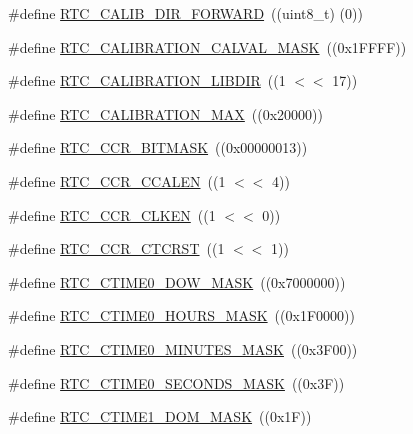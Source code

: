 \begin{DoxyCompactItemize}
\item 
\#define \hyperlink{group__RTC__17XX__40XX_ga4f53042ce8b730a4b2c6eb40b856e4e8}{R\+T\+C\+\_\+\+C\+A\+L\+I\+B\+\_\+\+D\+I\+R\+\_\+\+F\+O\+R\+W\+A\+RD}~((uint8\+\_\+t) (0))
\item 
\#define \hyperlink{group__RTC__17XX__40XX_gafe263620e5d0709ddf51abfdf408c770}{R\+T\+C\+\_\+\+C\+A\+L\+I\+B\+R\+A\+T\+I\+O\+N\+\_\+\+C\+A\+L\+V\+A\+L\+\_\+\+M\+A\+SK}~((0x1\+F\+F\+F\+F))
\item 
\#define \hyperlink{group__RTC__17XX__40XX_gae818a2f408ec0a1025ab3f02947d4b84}{R\+T\+C\+\_\+\+C\+A\+L\+I\+B\+R\+A\+T\+I\+O\+N\+\_\+\+L\+I\+B\+D\+IR}~((1 $<$$<$ 17))
\item 
\#define \hyperlink{group__RTC__17XX__40XX_gaeb077cfbe5f74f3b15ff72fed96abfe6}{R\+T\+C\+\_\+\+C\+A\+L\+I\+B\+R\+A\+T\+I\+O\+N\+\_\+\+M\+AX}~((0x20000))
\item 
\#define \hyperlink{group__RTC__17XX__40XX_gadc461b6f544d66841e09499b2b9734c7}{R\+T\+C\+\_\+\+C\+C\+R\+\_\+\+B\+I\+T\+M\+A\+SK}~((0x00000013))
\item 
\#define \hyperlink{group__RTC__17XX__40XX_gaeb77b2340d896fae77ea670bb70e972e}{R\+T\+C\+\_\+\+C\+C\+R\+\_\+\+C\+C\+A\+L\+EN}~((1 $<$$<$ 4))
\item 
\#define \hyperlink{group__RTC__17XX__40XX_gad08af035635f5acd7931cb982f95e771}{R\+T\+C\+\_\+\+C\+C\+R\+\_\+\+C\+L\+K\+EN}~((1 $<$$<$ 0))
\item 
\#define \hyperlink{group__RTC__17XX__40XX_ga70900054432c82dad7d63d4598502923}{R\+T\+C\+\_\+\+C\+C\+R\+\_\+\+C\+T\+C\+R\+ST}~((1 $<$$<$ 1))
\item 
\#define \hyperlink{group__RTC__17XX__40XX_gaee63196753f1c3ce9621a780c2fae3c9}{R\+T\+C\+\_\+\+C\+T\+I\+M\+E0\+\_\+\+D\+O\+W\+\_\+\+M\+A\+SK}~((0x7000000))
\item 
\#define \hyperlink{group__RTC__17XX__40XX_ga1778d80de2c97e680394bdd8770b9119}{R\+T\+C\+\_\+\+C\+T\+I\+M\+E0\+\_\+\+H\+O\+U\+R\+S\+\_\+\+M\+A\+SK}~((0x1\+F0000))
\item 
\#define \hyperlink{group__RTC__17XX__40XX_ga3b8e88e913a22b08a7b814763e4c8452}{R\+T\+C\+\_\+\+C\+T\+I\+M\+E0\+\_\+\+M\+I\+N\+U\+T\+E\+S\+\_\+\+M\+A\+SK}~((0x3\+F00))
\item 
\#define \hyperlink{group__RTC__17XX__40XX_ga913865a5d046fddddcae67fb05210d87}{R\+T\+C\+\_\+\+C\+T\+I\+M\+E0\+\_\+\+S\+E\+C\+O\+N\+D\+S\+\_\+\+M\+A\+SK}~((0x3\+F))
\item 
\#define \hyperlink{group__RTC__17XX__40XX_gaa8d85ab9bd2feee7a013b3b422bb740d}{R\+T\+C\+\_\+\+C\+T\+I\+M\+E1\+\_\+\+D\+O\+M\+\_\+\+M\+A\+SK}~((0x1\+F))

\end{DoxyCompactItemize}
